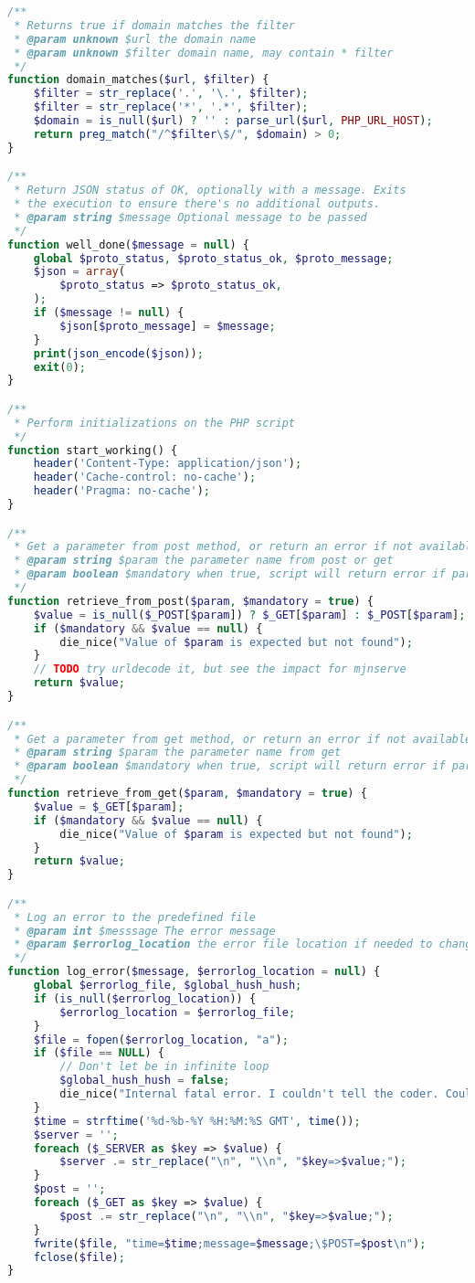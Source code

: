 \begin{lstlisting}[language=PHP,basicstyle=\tiny,caption=utils.php,label={lst:utils.php}]
/**
 * Returns true if domain matches the filter
 * @param unknown $url the domain name
 * @param unknown $filter domain name, may contain * filter
 */
function domain_matches($url, $filter) {
	$filter = str_replace('.', '\.', $filter);
	$filter = str_replace('*', '.*', $filter);
	$domain = is_null($url) ? '' : parse_url($url, PHP_URL_HOST);
	return preg_match("/^$filter\$/", $domain) > 0;
}

/**
 * Return JSON status of OK, optionally with a message. Exits
 * the execution to ensure there's no additional outputs. 
 * @param string $message Optional message to be passed
 */
function well_done($message = null) {
	global $proto_status, $proto_status_ok, $proto_message;
	$json = array(
		$proto_status => $proto_status_ok,
	);
	if ($message != null) {
		$json[$proto_message] = $message;
	}
	print(json_encode($json));
	exit(0);
}

/**
 * Perform initializations on the PHP script
 */
function start_working() {
	header('Content-Type: application/json');
	header('Cache-control: no-cache');
	header('Pragma: no-cache');
}

/**
 * Get a parameter from post method, or return an error if not available
 * @param string $param the parameter name from post or get
 * @param boolean $mandatory when true, script will return error if parameter is not found 
 */
function retrieve_from_post($param, $mandatory = true) {
	$value = is_null($_POST[$param]) ? $_GET[$param] : $_POST[$param];
	if ($mandatory && $value == null) {
		die_nice("Value of $param is expected but not found");
	}
	// TODO try urldecode it, but see the impact for mjnserve 
	return $value;
}

/**
 * Get a parameter from get method, or return an error if not available
 * @param string $param the parameter name from get
 * @param boolean $mandatory when true, script will return error if parameter is not found
 */
function retrieve_from_get($param, $mandatory = true) {
	$value = $_GET[$param];
	if ($mandatory && $value == null) {
		die_nice("Value of $param is expected but not found");
	}
	return $value;
}

/**
 * Log an error to the predefined file
 * @param int $messsage The error message
 * @param $errorlog_location the error file location if needed to change.
 */
function log_error($message, $errorlog_location = null) {
	global $errorlog_file, $global_hush_hush;
	if (is_null($errorlog_location)) {
		$errorlog_location = $errorlog_file;
	}
	$file = fopen($errorlog_location, "a");
	if ($file == NULL) {
		// Don't let be in infinite loop
		$global_hush_hush = false;
		die_nice("Internal fatal error. I couldn't tell the coder. Could you mail to pascalalfadian@live.com? Please...?");
	}
 	$time = strftime('%d-%b-%Y %H:%M:%S GMT', time());
 	$server = '';
 	foreach ($_SERVER as $key => $value) {
 		$server .= str_replace("\n", "\\n", "$key=>$value;");
 	}
 	$post = '';
 	foreach ($_GET as $key => $value) {
 		$post .= str_replace("\n", "\\n", "$key=>$value;");
 	}
	fwrite($file, "time=$time;message=$message;\$POST=$post\n");	
	fclose($file);
}


\end{lstlisting}
